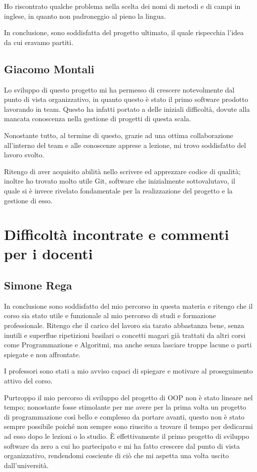 \documentclass[a4paper,12pt]{report}
\begin{document}
Ho riscontrato qualche problema nella scelta dei nomi di metodi e di campi in inglese, in quanto non padroneggio al pieno la lingua.

In conclusione, sono soddisfatta del progetto ultimato, il quale rispecchia l’idea da cui eravamo partiti.

\subsection{Giacomo Montali}

Lo sviluppo di questo progetto mi ha permesso di crescere notevolmente dal punto di vista organizzativo, in quanto questo è stato il primo software prodotto lavorando in team. Questo ha infatti portato a delle iniziali difficoltà, dovute alla mancata conoscenza nella gestione di progetti di questa scala. 

Nonostante tutto, al termine di questo, grazie ad una ottima collaborazione all’interno del team e alle conoscenze apprese a lezione, mi trovo soddisfatto del lavoro svolto.

Ritengo di aver acquisito abilità nello scrivere ed apprezzare codice di qualità; inoltre ho trovato molto utile Git, software che inizialmente sottovalutavo, il quale si è invece rivelato fondamentale per la realizzazione del progetto e la gestione di esso.


\section{Difficoltà incontrate e commenti per i docenti}

\subsection{Simone Rega}
In conclusione sono soddisfatto del mio percorso in questa materia e ritengo che il corso sia stato utile e funzionale al mio percorso di studi e formazione professionale. Ritengo che il carico del lavoro sia tarato abbastanza bene, senza inutili e superflue ripetizioni basilari o concetti magari già trattati da altri corsi come Programmazione e Algoritmi, ma anche senza lasciare troppe lacune o parti spiegate e non affrontate. 

I professori sono stati a mio avviso capaci di spiegare e motivare al proseguimento attivo del corso.

Purtroppo il mio percorso di sviluppo del progetto di OOP non è stato lineare nel tempo; nonostante fosse stimolante per me avere per la prima volta un progetto di programmazione così bello e complesso da portare avanti, questo non è stato sempre possibile poiché non sempre sono riuscito a trovare il tempo per dedicarmi ad esso dopo le lezioni o lo studio. È effettivamente il primo progetto di sviluppo software da zero a cui ho partecipato e mi ha fatto crescere dal punto di vista organizzativo, rendendomi cosciente di ciò che mi aspetta una volta uscito dall'università.
\end{document}
